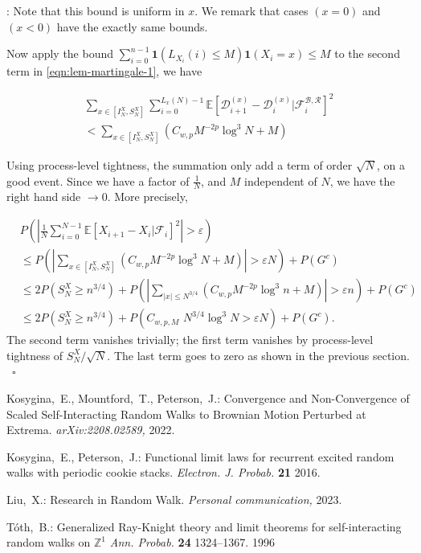 \documentclass[twoside,12pt,a4paper]{article}
\numberwithin{equation}{section}
\newenvironment{proof}[1][Proof]{{\sc #1}:}{~\hfill $\square$}
\begin{document}
\begin{proof}[Proof of Proposition~\ref{lm: control of martingale}]
Note that this bound is uniform in $x$. We remark that cases $(x=0)$ and $(x < 0)$ have the exactly same bounds. 

Now apply the bound $\sum_{i = 0}^{n-1} \mathbf{1}\left( L_{X_i}(i) \le M \right) \mathbf{1}(X_i = x) \le  M$ to the second term in \eqref{eqn:lem-martingale-1}, we have

\begin{multline}
	\sum_{x \in \left[ I_N^X, S_N^X \right]} \sum_{i = 0}^{L_x(N) - 1} \mathbb{E}\left[ \mathcal{D}_{i+1}^{(x)} - \mathcal{D}_i^{(x)} | \mathcal{F}_{i}^{\mathcal{B}, \mathcal{R}} \right]^2 \\
	< \sum_{x \in \left[ I_N^X, S_N^X \right]} (C_{w, p} M^{-2p} \log^3 N +M )
\end{multline}

Using process-level tightness, the summation only add a term of order $\sqrt{N}$, on a good event. Since we have a factor of $\frac{1}{N}$, and $M$ independent of $N$, we have the right hand side $\to 0$. More precisely,

\begin{align*}
	 &P\left( \left| \frac{1}{N} \sum_{i = 0}^{N-1} \mathbb{E}\left[ X_{i+1} - X_i | \mathcal{F}_i \right]^2  \right|  > \varepsilon \right)\\
	 &\le P\left( \left| \sum_{x \in \left[ I_N^X, S_N^X \right]} (C_{w, p} M^{-2p} \log^3 N +M ) \right| > \varepsilon  N \right) + P(G^c) \\
	 &\le 2 P\left( S_N^X \ge n^{3 / 4} \right) + P\left(  \left| \sum_{|x| \le N^{3 / 4}} (C_{w, p} M^{-2p} \log^3 n +M ) \right| > \varepsilon  n  \right) +P(G^c)  \\
	 &\le 2 P\left( S_N^X \ge n^{3 / 4} \right) + P\left(  C_{w, p, M} \,\, N^{3 / 4} \log^3 N > \varepsilon  N  \right) + P(G^c)
.\end{align*}
The second term vanishes trivially; the first term vanishes by process-level tightness of $S_N^X / \sqrt{N} $. The last term goes to zero as shown in the previous section.
\end{proof}

\begin{thebibliography}{99} 
  Kosygina,~E., Mountford,~T., Peterson,~J.: Convergence and Non-Convergence of Scaled Self-Interacting Random Walks to Brownian Motion Perturbed at Extrema. \textit{arXiv:2208.02589,} 2022.
 
  Kosygina,~E., Peterson,~J.: Functional limit laws for recurrent excited random walks with
 periodic cookie stacks. \textit{Electron. J. Probab.} \textbf{21} 2016.

 Liu,~X.: Research in Random Walk. \textit{Personal communication,} 2023.

 T\'{o}th,~B.: Generalized Ray-Knight theory and limit theorems for self-interacting random walks on $\mathbb{Z}^1$ \textit{Ann. Probab.} \textbf{24} 1324--1367. 1996
\end{thebibliography}
\end{document}
